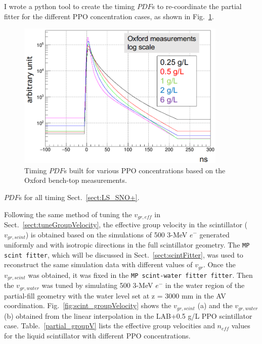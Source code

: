 I wrote a python tool to create the timing $PDF$s to re-coordinate the partial fitter for the different PPO concentration cases\cite{partialFitterPDF}, as shown in Fig.~\ref{fig:oxfordPdf}.
\begin{figure}[!htb]
	\centering
	\includegraphics[width=10cm]{oxfordPdf_log.png}
	\caption{Timing $PDF$s built for various PPO concentrations based on the Oxford bench-top measurements.}
	\label{fig:oxfordPdf}
\end{figure}


$PDF$s for all timing Sect.~\ref{sect:LS_SNO+}.

Following the same method of tuning the $v_{gr,eff}$ in Sect.~\ref{sect:tuneGroupVelocity}, the effective group velocity in the scintillator ($v_{gr,scint}$) is obtained based on the simulations of 500 3-MeV $e^-$ generated uniformly and with isotropic directions in the full scintillator geometry. The \texttt{MP scint fitter}, which will be discussed in Sect.~\ref{sect:scintFitter}, was used to reconstruct the same simulation data with different values of $v_{gr}$. Once the $v_{gr,scint}$ was obtained, it was fixed in the \texttt{MP scint-water fitter fitter}. Then the $v_{gr,water}$ was tuned by simulating 500 3-MeV $e^-$ in the water region of the partial-fill geometry with the water level set at z = 3000 mm in the AV coordination. Fig.~\ref{fig:scint_groupVelocity} shows the $v_{gr,scint}$ (a) and the $v_{gr,water}$ (b) obtained from the linear interpolation in the LAB+0.5 g/L PPO scintillator case. Table.~\ref{partial_groupV} lists the effective group velocities and $n_{eff}$ values for the liquid scintillator with different PPO concentrations. 
		
